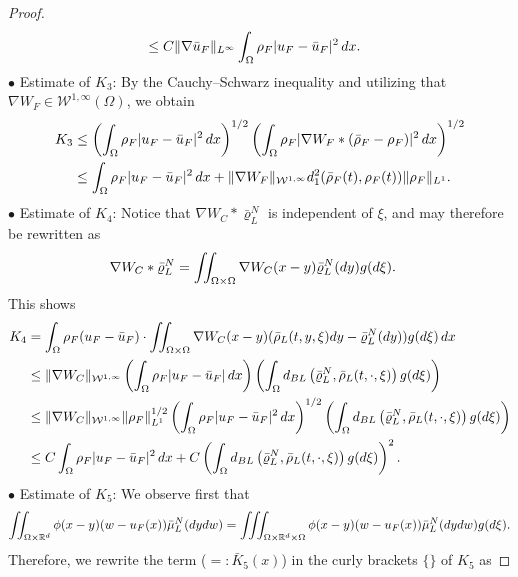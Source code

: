 \documentclass[10pt,a4paper]{amsart}
\newcommand{\R}{\mathbb{R}}
\newcommand{\calW}{\mathcal W}
\newcommand{\dw}{\textnormal{d}w}
\newcommand{\dx}{\textnormal{d}x}
\newcommand{\dxi}{\textnormal{d}\xi}
\newcommand{\dy}{\textnormal{d}y}
\begin{document}
\begin{proof}
\begin{align*}
        &\le C\|\nabla \bar u_F\|_{L^\infty} \int_{\Omega} \rho_F |u_F - \bar u_F|^2\,\dx.
    \end{align*}
    $\bullet$ Estimate of $K_3$: By the Cauchy--Schwarz inequality and utilizing that $\nabla W_F\in \calW^{1,\infty}(\Omega)$, we obtain
    \begin{align*}
        K_3 &\le \left(\int_{\Omega} \rho_F |u_F - \bar u_F|^2\,\dx \right)^{1/2} \left(\int_{\Omega} \rho_F |\nabla W_F * (\bar \rho_F - \rho_F)|^2\,\dx \right)^{1/2} \\
        &\le \int_{\Omega} \rho_F|u_F - \bar u_F|^2\,\dx + \|\nabla W_F\|_{\calW^{1,\infty}} d_{1}^2(\bar \rho_F(t), \rho_F(t)) \|\rho_F\|_{L^1}.
    \end{align*}
    $\bullet$ Estimate of $K_4$: Notice that $\nabla W_C * \bar\varrho_L^N$ is independent of $\xi$, and may therefore be rewritten as
    \begin{align*}
        \nabla W_C *  \bar\varrho_L^N &= \iint_{\Omega \times \Omega} \nabla W_C(x-y) \bar\varrho_L^N(\dy) g(\dxi).
    \end{align*}
    This shows
    \begin{align*}
        K_4 &= \int_{\Omega} \rho_F (u_F - \bar u_F)\cdot  \iint_{\Omega \times \Omega} \nabla W_C(x-y) (\bar \rho_L(t,y,\xi)\dy - \bar\varrho_L^N(\dy)) g(\dxi)\,\dx \\
        &\le \|\nabla W_C\|_{\calW^{1,\infty}}\left( \int_{\Omega} \rho_F |u_F - \bar u_F| \,\dx \right) \left( \int_{\Omega} d_{\rm BL}\left(\bar\varrho_L^N , \bar \rho_L(t,\cdot,\xi) \right) g(\dxi) \right) \\
        &\le \|\nabla W_C\|_{\calW^{1,\infty}} \|\rho_F\|_{L^1}^{1/2}\left(\int_{\Omega} \rho_F |u_F - \bar u_F|^2 \,\dx \right)^{1/2}\left( \int_{\Omega} d_{\rm BL}\left(\bar\varrho_L^N, \bar \rho_L(t,\cdot,\xi)\right) g(\dxi) \right) \\
        &\le C \int_{\Omega}\rho_F|u_F - \bar u_F|^2\,\dx + C \left( \int_{\Omega} d_{\rm BL}\left(\bar\varrho_L^N, \bar \rho_L(t,\cdot,\xi)\right) g(\dxi) \right)^2.
    \end{align*}
    $\bullet$ Estimate of $K_5$: We observe first that
    \begin{align*}
      \iint_{\Omega\times\R^d} \phi(x-y) (w- u_F(x)) \bar\mu_L^N(\dy\dw)  =       \iiint_{\Omega\times\R^d\times\Omega} \phi(x-y) (w- u_F(x)) \bar\mu_L^N(\dy\dw)g(\dxi).
    \end{align*}
    Therefore, we rewrite the term ($=: \bar K_5(x)$) in the curly brackets $\{\}$ of $K_5$ as

\end{proof}
\end{document}
